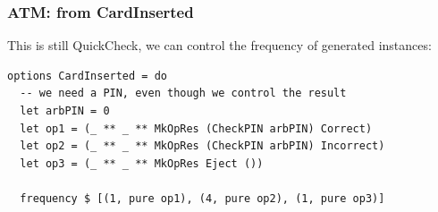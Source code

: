 \documentclass[compress]{beamer}
\begin{document}




\begin{frame}[fragile]
  \frametitle{ATM: from CardInserted}

  \large

  This is still QuickCheck, we can control the frequency of generated instances:

  \begin{verbatim}
options CardInserted = do
  -- we need a PIN, even though we control the result
  let arbPIN = 0
  let op1 = (_ ** _ ** MkOpRes (CheckPIN arbPIN) Correct)
  let op2 = (_ ** _ ** MkOpRes (CheckPIN arbPIN) Incorrect)
  let op3 = (_ ** _ ** MkOpRes Eject ())

  frequency $ [(1, pure op1), (4, pure op2), (1, pure op3)]
  \end{verbatim}

\end{frame}
\end{document}
